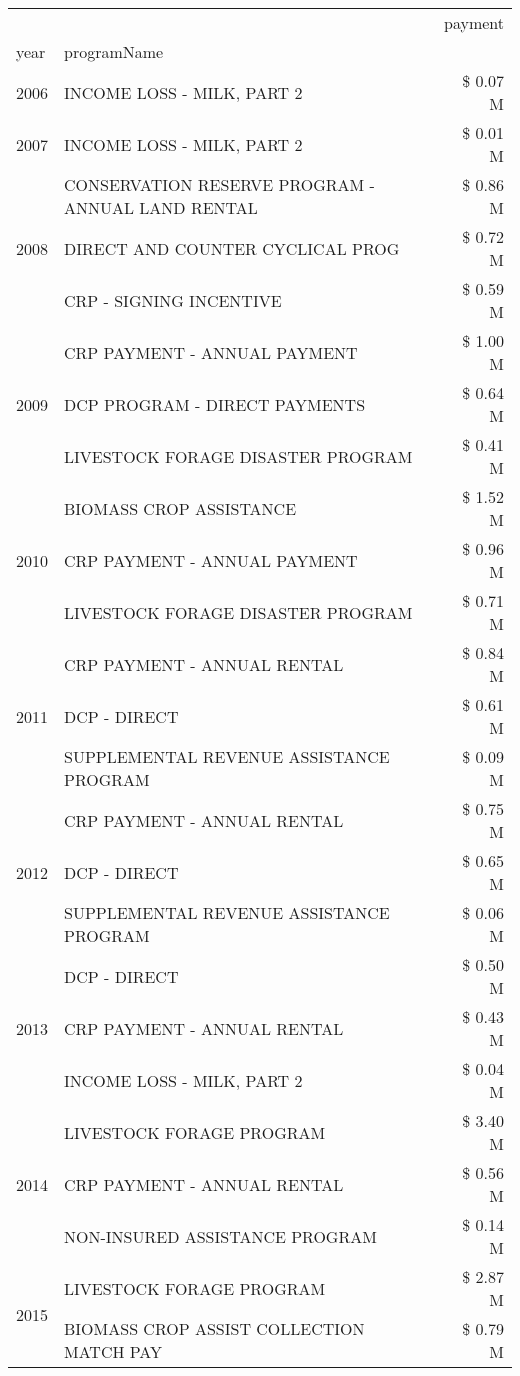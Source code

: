 \begin{tabular}{llr}
\toprule
 &  & payment \\
year & programName &  \\
\midrule
2006 & INCOME LOSS - MILK, PART 2 & \$ 0.07 M \\
\cline{1-3}
2007 & INCOME LOSS - MILK, PART 2 & \$ 0.01 M \\
\cline{1-3}
\multirow[t]{3}{*}{2008} & CONSERVATION RESERVE PROGRAM - ANNUAL LAND RENTAL & \$ 0.86 M \\
 & DIRECT AND COUNTER CYCLICAL PROG & \$ 0.72 M \\
 & CRP - SIGNING INCENTIVE & \$ 0.59 M \\
\cline{1-3}
\multirow[t]{3}{*}{2009} & CRP PAYMENT - ANNUAL PAYMENT & \$ 1.00 M \\
 & DCP PROGRAM - DIRECT PAYMENTS & \$ 0.64 M \\
 & LIVESTOCK FORAGE DISASTER  PROGRAM & \$ 0.41 M \\
\cline{1-3}
\multirow[t]{3}{*}{2010} & BIOMASS CROP ASSISTANCE & \$ 1.52 M \\
 & CRP PAYMENT - ANNUAL PAYMENT & \$ 0.96 M \\
 & LIVESTOCK FORAGE DISASTER  PROGRAM & \$ 0.71 M \\
\cline{1-3}
\multirow[t]{3}{*}{2011} & CRP PAYMENT - ANNUAL RENTAL & \$ 0.84 M \\
 & DCP - DIRECT & \$ 0.61 M \\
 & SUPPLEMENTAL REVENUE ASSISTANCE PROGRAM & \$ 0.09 M \\
\cline{1-3}
\multirow[t]{3}{*}{2012} & CRP PAYMENT - ANNUAL RENTAL & \$ 0.75 M \\
 & DCP - DIRECT & \$ 0.65 M \\
 & SUPPLEMENTAL REVENUE ASSISTANCE PROGRAM & \$ 0.06 M \\
\cline{1-3}
\multirow[t]{3}{*}{2013} & DCP - DIRECT & \$ 0.50 M \\
 & CRP PAYMENT - ANNUAL RENTAL & \$ 0.43 M \\
 & INCOME LOSS - MILK, PART 2 & \$ 0.04 M \\
\cline{1-3}
\multirow[t]{3}{*}{2014} & LIVESTOCK FORAGE PROGRAM & \$ 3.40 M \\
 & CRP PAYMENT - ANNUAL RENTAL & \$ 0.56 M \\
 & NON-INSURED ASSISTANCE PROGRAM & \$ 0.14 M \\
\cline{1-3}
\multirow[t]{3}{*}{2015} & LIVESTOCK FORAGE PROGRAM & \$ 2.87 M \\
 & BIOMASS CROP ASSIST COLLECTION MATCH PAY & \$ 0.79 M \\

\end{tabular}
